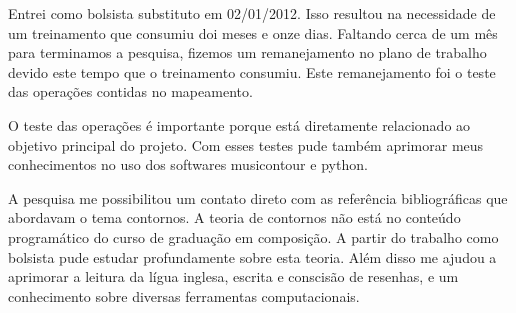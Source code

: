 \documentclass[11pt]{article}
\begin{document}
Entrei como bolsista substituto em 02/01/2012. Isso resultou na
necessidade de um treinamento que consumiu doi meses e onze dias.
Faltando cerca de um mês para terminamos a pesquisa, fizemos um
remanejamento no plano de trabalho devido este tempo que o treinamento
consumiu. Este remanejamento foi o teste das operações contidas no 
mapeamento.

O teste das operações é importante porque está diretamente
relacionado ao objetivo principal do projeto. Com esses testes pude
também aprimorar meus conhecimentos no uso dos softwares musicontour
e python.

A pesquisa me possibilitou um contato direto com as referência bibliográficas que abordavam
o tema contornos.
A teoria de contornos não está no conteúdo programático do curso de
graduação em composição.
A partir do trabalho como bolsista pude estudar profundamente sobre esta teoria.
Além disso me
ajudou a aprimorar a leitura da lígua inglesa, escrita e
conscisão de resenhas, e um conhecimento sobre diversas ferramentas
computacionais.


\renewcommand{\refname}{Referências bibliográficas (máximo 15)}

\nocite{
  Friedmann1985,
  Friedmann1987,
  Morris1987,
  Marvin1987,
  Marvin1988,
  Polansky1992,
  Morris1993,
  Clifford1995,
  Quinn1997,
  Beard2003,
  Sampaio2008,
  Schultz2008,
  Schultz2009,
  Bor2009
}





\end{document}
